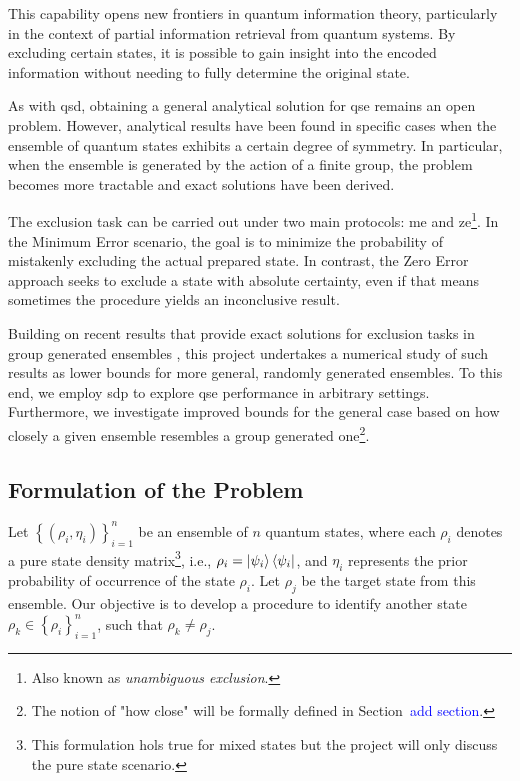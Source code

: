 \documentclass[12pt,letterpaper]{article}
\begin{document}
\begin{multicols}{2}
This capability opens new frontiers in quantum information theory, particularly in the context of partial information retrieval from quantum systems. By excluding certain states, it is possible to gain insight into the encoded information without needing to fully determine the original state.

As with \gls{qsd}, obtaining a general analytical solution for \gls{qse} remains an open problem. However, analytical results have been found in specific cases when the ensemble of quantum states exhibits a certain degree of symmetry. In particular, when the ensemble is generated by the action of a finite group, the problem becomes more tractable and exact solutions have been derived.

The exclusion task can be carried out under two main protocols: \gls{me} and \gls{ze}\footnote{Also known as \emph{unambiguous exclusion}.}. In the Minimum Error scenario, the goal is to minimize the probability of mistakenly excluding the actual prepared state. In contrast, the Zero Error approach seeks to exclude a state with absolute certainty, even if that means sometimes the procedure yields an inconclusive result.

Building on recent results that provide exact solutions for exclusion tasks in group generated ensembles \cite{MainPaper}, this project undertakes a numerical study of such results as lower bounds for more general, randomly generated ensembles. To this end, we employ \gls{sdp} to explore \gls{qse} performance in arbitrary settings. Furthermore, we investigate improved bounds for the general case based on how closely a given ensemble resembles a group generated one\footnote{The notion of "how close" will be formally defined in Section~\textcolor{blue}{add section}.}.

\subsection{Formulation of the Problem}

Let $\left\{(\rho_i, \eta_i)\right\}_{i=1}^n$ be an ensemble of $n$ quantum states, where each $\rho_i$ denotes a pure state density matrix\footnote{This formulation hols true for mixed states but the project will only discuss the pure state scenario.}, i.e., $\rho_i = \ket{\psi_i}\bra{\psi_i}$, and $\eta_i$ represents the prior probability of occurrence of the state $\rho_i$. Let $\rho_j$ be the target state from this ensemble. Our objective is to develop a procedure to identify another state $\rho_k \in \left\{\rho_i\right\}_{i=1}^n$, such that $\rho_k \neq \rho_j$.


\end{multicols}
\end{document}
